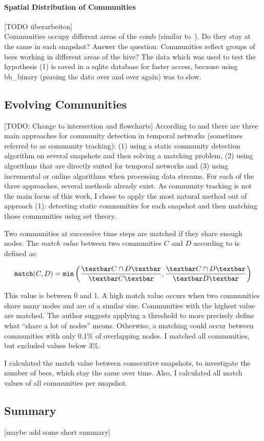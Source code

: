 \paragraph{Spatial Distribution of Communities}
[TODO überarbeiten]\\
Communities occupy different areas of the comb (similar to~\cite{baracchi2014socio}). Do they stay at the same in each snapshot?
Answer the question: Communities reflect groups of bees working in different areas of the hive? The data which was used to test the hypothesis (1) is saved in a sqlite database for faster access, because using bb\_binary (parsing the data over and over again) was to slow.\\

\subsection{Evolving Communities}
\label{sec:bg:tracking}
[TODO: Change to intersection and flowcharts]
According to \textcite{aynaud2013communities} and  \textcite{brodka2014community} there are three main approaches for community detection in temporal networks (sometimes referred to as community tracking): (1) using a static community detection algorithm on several snapshots and then solving a matching problem, (2) using algorithms that are directly suited for temporal networks and (3) using incremental or online algorithms when processing data streams. For each of the three approaches, several methods already exist.
As community tracking is not the main focus of this work, I chose to apply the most natural method out of approach (1): detecting static communities for each snapshot and then matching those communities using set theory.


Two communities at successive time steps are matched if they share enough nodes.
The \emph{match value} between two communities $C$ and $D$ according to \textcite{hopcroft2004tracking} is defined as:

\begin{equation}
\label{eq:match}
\texttt{match}(C,D) = \texttt{min}\left( \frac{\textbar C\cap D \textbar}{\textbar C\textbar }, \frac{\textbar C\cap D \textbar}{\textbar D \textbar }\right)
\end{equation}


This value is between 0 and 1. A high match value occurs when two communities share many nodes and are of a similar size. Communities with the highest value are matched. The author suggests applying a threshold to more precisely define what ``share a lot of nodes'' means. Otherwise, a matching could occur between communities with only 0.1\% of overlapping nodes. I matched all communities, but excluded values below 3\%.


I calculated the match value between consecutive snapshots, to investigate the number of bees, which stay the same over time. Also, I calculated all match values of all communities per snapshot.

\subsection{Summary}
[maybe add some short summary]